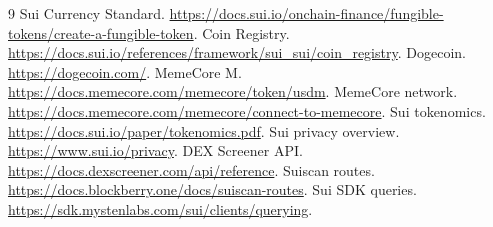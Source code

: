 \documentclass[11pt]{article}
\begin{document}
\begin{thebibliography}{9}
\footnotesize
{} Sui Currency Standard. \url{https://docs.sui.io/onchain-finance/fungible-tokens/create-a-fungible-token}.
 Coin Registry. \url{https://docs.sui.io/references/framework/sui_sui/coin_registry}.
 Dogecoin. \url{https://dogecoin.com/}.
 MemeCore M. \url{https://docs.memecore.com/memecore/token/usdm}.
 MemeCore network. \url{https://docs.memecore.com/memecore/connect-to-memecore}.
 Sui tokenomics. \url{https://docs.sui.io/paper/tokenomics.pdf}.
 Sui privacy overview. \url{https://www.sui.io/privacy}.
 DEX Screener API. \url{https://docs.dexscreener.com/api/reference}.
 Suiscan routes. \url{https://docs.blockberry.one/docs/suiscan-routes}.
 Sui SDK queries. \url{https://sdk.mystenlabs.com/sui/clients/querying}.
\end{thebibliography}
\end{document}
